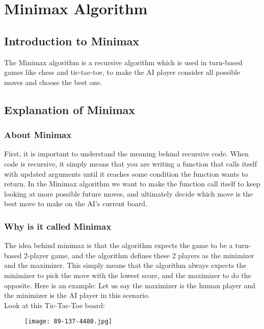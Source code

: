 \section{Minimax Algorithm} 
\label{sec:Minimax Algorithm}

\subsection{Introduction to Minimax}
\label{subsec:Introduction to Minimax}
The Minimax algorithm is a recursive algorithm which is used in turn-based games like chess and tic-tac-toe, 
to make the AI player consider all possible moves and choose the best one.

\subsection{Explanation of Minimax}
\label{subsec:Explanation of Minimax}
\subsubsection{About Minimax}
First, it is important to understand the meaning behind recursive code. 
When code is recursive, it simply means that you are writing a function that calls itself with updated arguments until it reaches some condition the function wants to return. 
In the Minimax algorithm we want to make the function call itself to keep looking at more possible future moves, 
and ultimately decide which move is the best move to make on the AI’s current board.
\subsubsection{Why is it called Minimax}
The idea behind minimax is that the algorithm expects the game to be a turn-based 2-player game, and the algorithm defines these 2 players as the minimizer and the maximizer. 
This simply means that the algorithm always expects the minimizer to pick the move with the lowest score, and the maximizer to do the opposite. 
Here is an example: Let us say the maximizer is the human player and the minimizer is the AI player in this scenario.\\

Look at this Tic-Tac-Toe board:\\
\begin{figure}
    \texttt{[image: 89-137-4480.jpg]}\\
    \label{fig:Board Example}
\end{figure}

